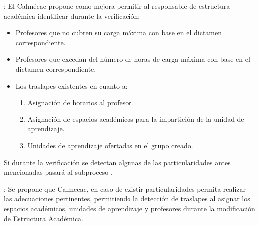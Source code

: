\begin{PDescripcion}
\begin{enumerate}
		
		\Ppaso [\PSubProceso]: El Calmécac propone como mejora permitir al responsable de estructura académica identificar durante la verificación:
		
		\begin{itemize}
			\item Profesores que no cubren su carga máxima con base en el dictamen correspondiente.
			\item Profesores que excedan del número de horas de carga máxima con base en el dictamen correspondiente.
			\item Los traslapes existentes en cuanto a:
				\begin{enumerate}
					\item Asignación de horarios al profesor.
					\item Asignación de espacios académicos para la impartición de la unidad de aprendizaje.
					\item Unidades de aprendizaje ofertadas en el grupo creado.
				\end{enumerate}
		\end{itemize}
		
		Si durante la verificación se detectan algunas de las particularidades antes mencionadas pasará al subproceso  .
		
		\Ppaso [\PSubProceso]: Se propone que Calmecac, en caso de existir particularidades permita realizar las adecuaciones pertinentes, permitiendo la detección de traslapes al asignar los espacios académicos, unidades de aprendizaje y profesores durante la modificación de Estructura Académica.
	\end{enumerate}
\end{PDescripcion}	